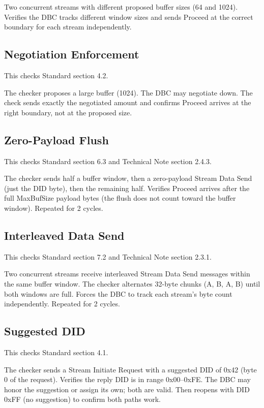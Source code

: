 Two concurrent streams with different proposed buffer sizes (64 and 1024).
Verifies the DBC tracks different window sizes and sends Proceed at the
correct boundary for each stream independently.

\subsection{Negotiation Enforcement}

This checks Standard section 4.2.

The checker proposes a large buffer (1024).  The DBC may negotiate down.
The check sends exactly the negotiated amount and confirms Proceed arrives at
the right boundary, not at the proposed size.

\subsection{Zero-Payload Flush}

This checks Standard section 6.3 and Technical Note section 2.4.3.

The checker sends half a buffer window, then a zero-payload Stream Data Send
(just the DID byte), then the remaining half.  Verifies Proceed arrives after
the full MaxBufSize payload bytes (the flush does not count toward the buffer
window).  Repeated for 2 cycles.

\subsection{Interleaved Data Send}

This checks Standard section 7.2 and Technical Note section 2.3.1.

Two concurrent streams receive interleaved Stream Data Send messages within
the same buffer window.  The checker alternates 32-byte chunks (A, B, A, B)
until both windows are full.  Forces the DBC to track each stream's byte count
independently.  Repeated for 2 cycles.

\subsection{Suggested DID}

This checks Standard section 4.1.

The checker sends a Stream Initiate Request with a suggested DID of 0x42
(byte 0 of the request).  Verifies the reply DID is in range 0x00--0xFE.
The DBC may honor the suggestion or assign its own; both are valid.
Then reopens with DID 0xFF (no suggestion) to confirm both paths work.


